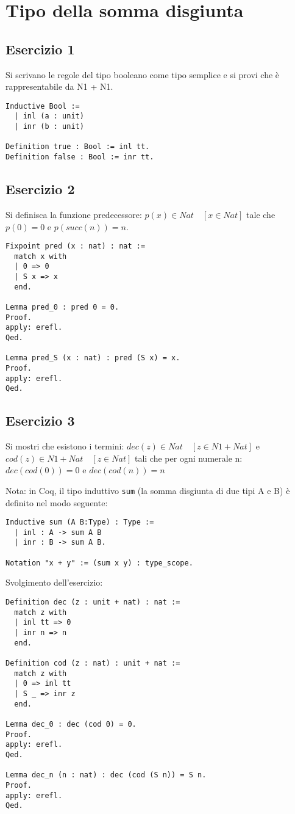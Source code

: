 \newpage
\section{Tipo della somma disgiunta}

\subsection{Esercizio 1}

Si scrivano le regole del tipo booleano come tipo semplice e si provi che è
rappresentabile da N1 + N1.

\begin{lstlisting}[language=Coq]
Inductive Bool :=
  | inl (a : unit)
  | inr (b : unit)

Definition true : Bool := inl tt.
Definition false : Bool := inr tt.
\end{lstlisting}

\subsection{Esercizio 2}

Si definisca la funzione predecessore: $p(x) \in Nat \quad [x \in Nat]$
tale che $p(0) = 0$ e $p(succ(n)) = n$.

\begin{lstlisting}[language=Coq]
Fixpoint pred (x : nat) : nat :=
  match x with
  | 0 => 0
  | S x => x
  end.

Lemma pred_0 : pred 0 = 0.
Proof.
apply: erefl.
Qed.

Lemma pred_S (x : nat) : pred (S x) = x.
Proof.
apply: erefl.
Qed.
\end{lstlisting}

\subsection{Esercizio 3}

Si mostri che esistono i termini: $dec(z) \in Nat \quad [z \in N1 + Nat]$ e $cod(z) \in N1 + Nat \quad [z \in Nat]$ tali che per ogni numerale n: $dec(cod(0)) = 0$ e $dec(cod(n)) = n$

Nota: in Coq, il tipo induttivo \texttt{sum} (la somma disgiunta di due tipi A e B) è definito nel modo seguente:

\begin{lstlisting}[language=Coq]
Inductive sum (A B:Type) : Type :=
  | inl : A -> sum A B
  | inr : B -> sum A B.

Notation "x + y" := (sum x y) : type_scope.
\end{lstlisting}

Svolgimento dell'esercizio:

\begin{lstlisting}[language=Coq]
Definition dec (z : unit + nat) : nat :=
  match z with
  | inl tt => 0
  | inr n => n
  end.

Definition cod (z : nat) : unit + nat :=
  match z with
  | 0 => inl tt
  | S _ => inr z
  end.

Lemma dec_0 : dec (cod 0) = 0.
Proof.
apply: erefl.
Qed.

Lemma dec_n (n : nat) : dec (cod (S n)) = S n.
Proof.
apply: erefl.
Qed.
\end{lstlisting}
